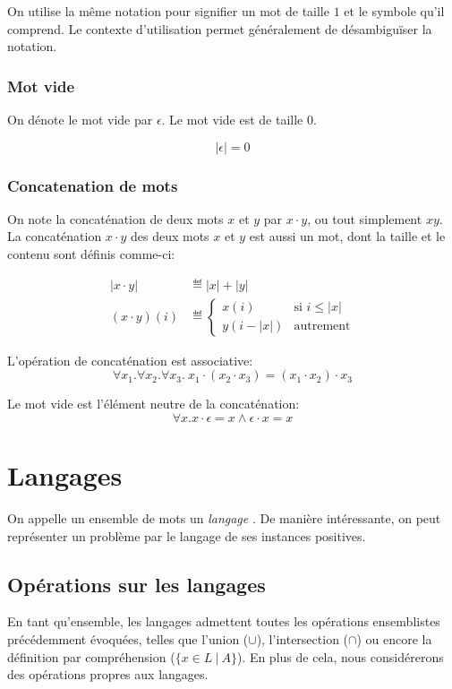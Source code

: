 On utilise la même notation pour signifier un mot de taille $1$ et le symbole qu'il comprend.
Le contexte d'utilisation permet généralement de désambiguïser la notation. 

\subsubsection{Mot vide}

On dénote le mot vide par $\epsilon$.
Le mot vide est de taille $0$.

\[
|\epsilon| = 0
\]

\subsubsection{Concatenation de mots}

On note la concaténation de deux mots $x$ et $y$ par $x \cdot y$, ou tout simplement $xy$.
La concaténation $x \cdot y$ des deux mots $x$ et $y$ est aussi un mot, dont la taille et le contenu sont définis comme-ci:

\begin{align*}
|x \cdot y| &\eqdef |x| + |y|\\
(x \cdot y)(i) &\eqdef \begin{cases}
x(i) & \text{si $i \leq |x|$}\\
y(i - |x|) & \text{autrement}
\end{cases}
\end{align*}

L'opération de concaténation est associative:
\[
\forall x_1. \forall x_2. \forall x_3.\ x_1 \cdot (x_2 \cdot x_3) = (x_1 \cdot x_2) \cdot x_3   
\]

Le mot vide est l'élément neutre de la concaténation:
\[
\forall x. x \cdot \epsilon = x \wedge \epsilon \cdot x = x
\]

\section{Langages}

On appelle un ensemble de mots un \og \textit{langage} \fg{}.
De manière intéressante, on peut représenter un problème par le langage de ses instances positives.

\subsection{Opérations sur les langages}

En tant qu'ensemble, les langages admettent toutes les opérations ensemblistes précédemment évoquées, telles que l'union ($\cup$), l'intersection ($\cap$) ou encore la définition par compréhension ($\{ x \in L\ |\ A \}$).
En plus de cela, nous considérerons des opérations propres aux langages.


